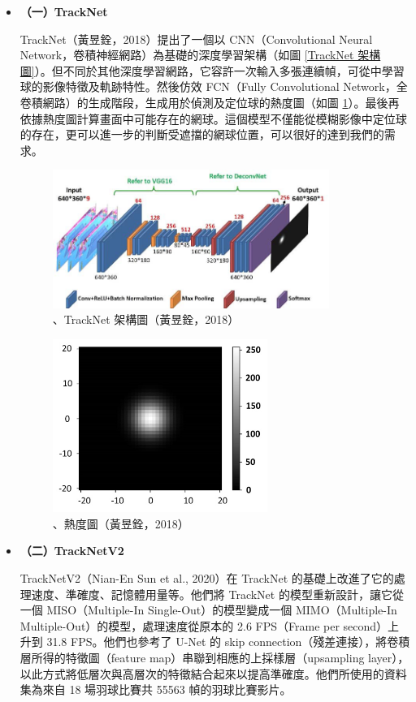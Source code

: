 \begin{itemize}
    \setlength\parindent{2em}
    \item []
    \textbf{（一）TrackNet}

    TrackNet（黃昱銓，2018）提出了一個以 CNN（Convolutional Neural Network，卷積神經網路）為基礎的深度學習架構（如圖 \ref{TrackNet 架構圖}）。但不同於其他深度學習網路，它容許一次輸入多張連續幀，可從中學習球的影像特徵及軌跡特性。然後仿效 FCN（Fully Convolutional Network，全卷積網路）的生成階段，生成用於偵測及定位球的熱度圖（如圖 \ref{熱度圖}）。最後再依據熱度圖計算畫面中可能存在的網球。這個模型不僅能從模糊影像中定位球的存在，更可以進一步的判斷受遮擋的網球位置，可以很好的達到我們的需求。
    
    \begin{figure}[H]
        \centering
        \includegraphics[width = 9cm]{picture/TrackNet 架構圖.jpg}\\
        \caption{、TrackNet 架構圖（黃昱銓，2018）}
        \label{TrackNet 架構圖}
        \vspace{1cm}
        \includegraphics[width = 7cm]{picture/熱度圖.jpg}
        \caption{、熱度圖（黃昱銓，2018）}
        \label{熱度圖}
    \end{figure}
    \item[]
    \textbf{（二）TrackNetV2}

    TrackNetV2（Nian-En Sun et al., 2020）在 TrackNet 的基礎上改進了它的處理速度、準確度、記憶體用量等。他們將 TrackNet 的模型重新設計，讓它從一個 MISO（Multiple-In Single-Out）的模型變成一個 MIMO（Multiple-In Multiple-Out）的模型，處理速度從原本的 2.6 FPS（Frame per second）上升到 31.8 FPS。他們也參考了 U-Net 的 skip connection（殘差連接），將卷積層所得的特徵圖（feature map）串聯到相應的上採樣層（upsampling layer），以此方式將低層次與高層次的特徵結合起來以提高準確度。他們所使用的資料集為來自 18 場羽球比賽共 55563 幀的羽球比賽影片。


\end{itemize}
